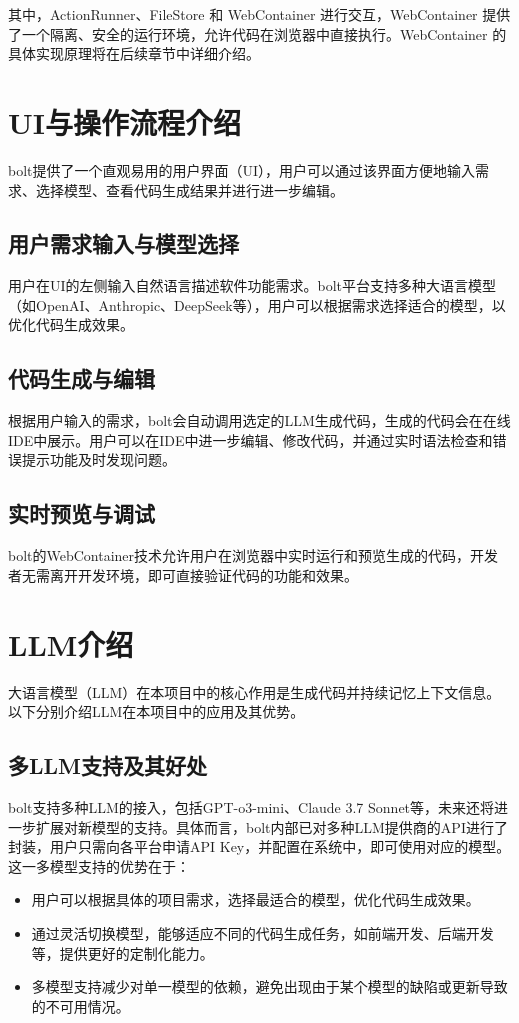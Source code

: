 其中，ActionRunner、FileStore 和 WebContainer 进行交互，WebContainer 提供了一个隔离、安全的运行环境，允许代码在浏览器中直接执行。WebContainer 的具体实现原理将在后续章节中详细介绍。

\section{UI与操作流程介绍}

bolt提供了一个直观易用的用户界面（UI），用户可以通过该界面方便地输入需求、选择模型、查看代码生成结果并进行进一步编辑。

\subsection{用户需求输入与模型选择}

用户在UI的左侧输入自然语言描述软件功能需求。bolt平台支持多种大语言模型（如OpenAI、Anthropic、DeepSeek等），用户可以根据需求选择适合的模型，以优化代码生成效果。

\subsection{代码生成与编辑}

根据用户输入的需求，bolt会自动调用选定的LLM生成代码，生成的代码会在在线IDE中展示。用户可以在IDE中进一步编辑、修改代码，并通过实时语法检查和错误提示功能及时发现问题。

\subsection{实时预览与调试}

bolt的WebContainer技术允许用户在浏览器中实时运行和预览生成的代码，开发者无需离开开发环境，即可直接验证代码的功能和效果。

\section{LLM介绍}

大语言模型（LLM）在本项目中的核心作用是生成代码并持续记忆上下文信息。以下分别介绍LLM在本项目中的应用及其优势。

\subsection{多LLM支持及其好处}

bolt支持多种LLM的接入，包括GPT-o3-mini、Claude 3.7 Sonnet等，未来还将进一步扩展对新模型的支持。具体而言，bolt内部已对多种LLM提供商的API进行了封装，用户只需向各平台申请API Key，并配置在系统中，即可使用对应的模型。
这一多模型支持的优势在于：
\begin{itemize}
    \item 用户可以根据具体的项目需求，选择最适合的模型，优化代码生成效果。
    \item 通过灵活切换模型，能够适应不同的代码生成任务，如前端开发、后端开发等，提供更好的定制化能力。
    \item 多模型支持减少对单一模型的依赖，避免出现由于某个模型的缺陷或更新导致的不可用情况。
\end{itemize}

